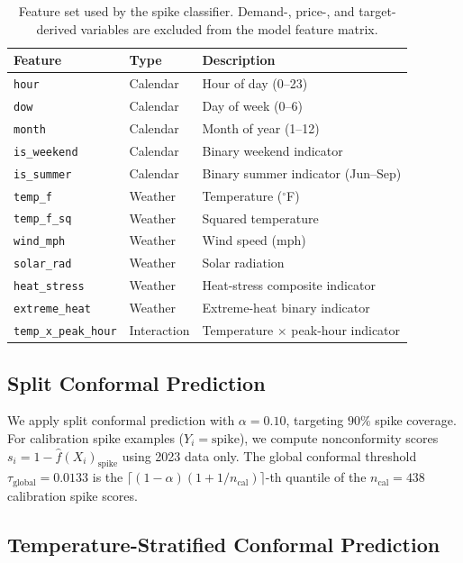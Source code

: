 \documentclass{article}
\newcommand{\calib}{\mathrm{cal}}
\newcommand{\spike}{\mathrm{spike}}
\begin{document}
\begin{table}[t]
\centering
\caption{Feature set used by the spike classifier. Demand-, price-, and
target-derived variables are excluded from the model feature matrix.}
\label{tab:features}
\begin{tabular}{lll}
\toprule
Feature & Type & Description \\
\midrule
\texttt{hour} & Calendar & Hour of day (0--23) \\
\texttt{dow} & Calendar & Day of week (0--6) \\
\texttt{month} & Calendar & Month of year (1--12) \\
\texttt{is\_weekend} & Calendar & Binary weekend indicator \\
\texttt{is\_summer} & Calendar & Binary summer indicator (Jun--Sep) \\
\texttt{temp\_f} & Weather & Temperature ($^{\circ}$F) \\
\texttt{temp\_f\_sq} & Weather & Squared temperature \\
\texttt{wind\_mph} & Weather & Wind speed (mph) \\
\texttt{solar\_rad} & Weather & Solar radiation \\
\texttt{heat\_stress} & Weather & Heat-stress composite indicator \\
\texttt{extreme\_heat} & Weather & Extreme-heat binary indicator \\
\texttt{temp\_x\_peak\_hour} & Interaction & Temperature $\times$ peak-hour indicator \\
\bottomrule
\end{tabular}
\end{table}

\subsection{Split Conformal Prediction}

We apply split conformal prediction with $\alpha=0.10$, targeting
$90\%$ spike coverage. For calibration spike examples ($Y_i=\spike$), we
compute nonconformity scores $s_i = 1 - \hat{f}(X_i)_{\spike}$ using 2023
data only. The global conformal threshold $\tau_{\mathrm{global}} = 0.0133$
is the $\lceil(1-\alpha)(1+1/n_{\calib})\rceil$-th quantile of the $n_{\calib}
= 438$ calibration spike scores.

\subsection{Temperature-Stratified Conformal Prediction}
\end{document}
